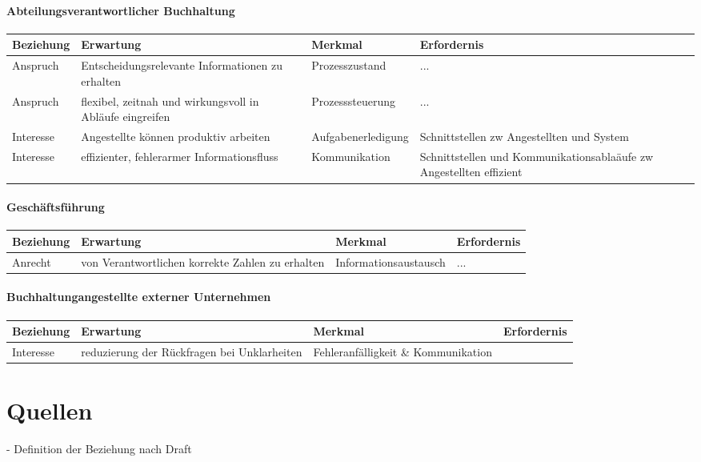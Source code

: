 \documentclass[11pt,oneside,a4paper,notitlepage]{article}
\begin{document}
\paragraph*{Abteilungsverantwortlicher Buchhaltung }
\begin{center}
\begin{tabular}{| p{25mm} | p{5cm} | p{35mm} | p{5cm} |}
\hline
Beziehung & Erwartung & Merkmal & Erfordernis\\
\hline
Anspruch & Entscheidungsrelevante Informationen zu erhalten & Prozesszustand & ...\\
Anspruch & flexibel, zeitnah und wirkungsvoll in Abläufe eingreifen  & Prozesssteuerung & ...\\
Interesse & Angestellte können produktiv arbeiten & Aufgabenerledigung & Schnittstellen zw Angestellten und System\\
Interesse & effizienter, fehlerarmer Informationsfluss & Kommunikation & Schnittstellen und Kommunikationsablaäufe zw Angestellten effizient\\
%
\hline
\end{tabular}
\end{center}
%

%
\paragraph*{Geschäftsführung}
\begin{center}
\begin{tabular}{| p{25mm} | p{5cm} | p{35mm} | p{5cm} |}
\hline
Beziehung & Erwartung & Merkmal & Erfordernis\\
\hline
%
Anrecht & von Verantwortlichen korrekte Zahlen zu erhalten & Informationsaustausch & ... \\
%
\hline
\end{tabular}
\end{center}
%

%
\paragraph*{Buchhaltungangestellte externer Unternehmen}
%
\begin{center}
\begin{tabular}{| p{25mm} | p{5cm} | p{35mm} | p{5cm} |}
\hline
Beziehung & Erwartung & Merkmal & Erfordernis\\
\hline
Interesse & reduzierung der Rückfragen bei Unklarheiten & Fehleranfälligkeit \& Kommunikation &  \\
%
\hline
\end{tabular}
\end{center}

\section{Quellen}
- Definition der Beziehung nach Draft\\
\end{document}
